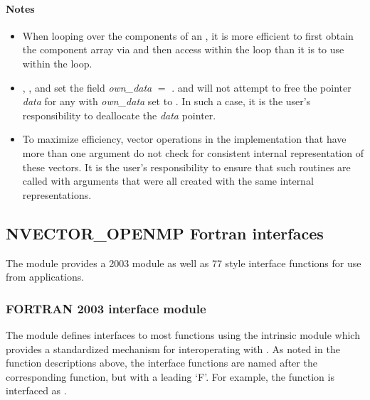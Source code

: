 \paragraph{\bf Notes}                                                      
           
\begin{itemize}
                                        
\item
  When looping over the components of an  , it is     
  more efficient to first obtain the component array via       
   and then access  within the     
  loop than it is to use  within the loop.        

\item
  {\warn}, , 
  and  set the field 
  {\em own\_data} $=$ . 
   and 
  will not attempt to free the pointer {\em data} for any  with
  {\em own\_data} set to . In such a case, it is the user's responsibility to
  deallocate the {\em data} pointer.
                                     
\item
  {\warn}To maximize efficiency, vector operations in the {\nvecopenmp} implementation
  that have more than one  argument do not check for
  consistent internal representation of these vectors. It is the user's 
  responsibility to ensure that such routines are called with 
  arguments that were all created with the same internal representations.

\end{itemize}


\subsection{NVECTOR\_OPENMP Fortran interfaces}
\label{ss:nvec_openmp_fortran}

The {\nvecopenmp} module provides a {\F} 2003 module as well as {\F} 77
style interface functions for use from {\F} applications.

\subsubsection*{FORTRAN 2003 interface module}
The  {\F} module defines interfaces to most
{\nvecopenmp} {\CC} functions using the intrinsic 
module which provides a standardized mechanism for interoperating with {\CC}. As
noted in the {\CC} function descriptions above, the interface functions are
named after the corresponding {\CC} function, but with a leading `F'. For
example, the function  is interfaced as
.

